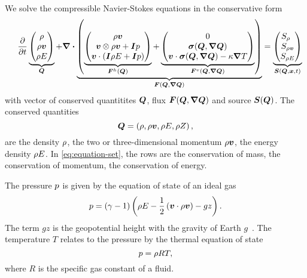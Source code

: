 \documentclass[runningheads]{llncs}
\newcommand{\eqA}{}
\newcommand{\eqB}{(}
\newcommand{\eqMultiA}{(}
\newcommand{\eqMultiB}{)}
\DeclareRobustCommand{\pcrefSingle}[1]{%
\begingroup%
  \renewcommand{\eqA}{(}\renewcommand{\eqB}{}%
\cref{#1}%
\endgroup%
}
\DeclareRobustCommand{\pcrefMulti}[1]{%
\begingroup%
    \renewcommand{\eqMultiA}{}\renewcommand{\eqMultiB}{}%
    (\cref{#1})%
\endgroup%
}
\DeclareRobustCommand{\pcref}[1]{%
\IfSubStr{#1}{,}{\pcrefMulti{#1}}{\pcrefSingle{#1}}%
}
\begin{document}
We  solve the compressible Navier-Stokes equations in the conservative form%
\begin{equation}
 \label{eq:equation-set} 
\quad
  \pdv{}{t}
  \underbrace{
  \begin{pmatrix}
    \Qrho\\
    \Qj\\
    \QE
    \end{pmatrix}}_{\Q}
  +
  \divergence{
  \underbrace{
  \left(
   \underbrace{\hyperFluxDef}_{\hyperFlux(\Q)}
+
\underbrace{\viscFluxDef}_{\viscFlux(\Q, \gradQ)}
  \right)}_{\flux(\Q, \gradQ)}}
 =
  \underbrace{
  \begin{pmatrix}
    \source[\Qrho\phantom{\Qrho}]\\
    \source[\Qj]\\
    \source[\QE]
    \end{pmatrix}}_{\source(\Q, \bm{x}, t)}
\end{equation}
with vector of conserved quantitites $\bm{Q}$, flux $\flux(\Q, \gradQ)$ and source $\source(\Q)$.
The conserved quantities
\begin{equation} 
  \label{eq:conserved-variables}
 \bm{Q} = \left( \rho, \rho \bm{v}, \rho E, \rho Z \right),
\end{equation}
are the density $\rho$, the two or three-dimensional momentum $\rho \bm{v}$, the energy density $\rho E$.
In \cref{eq:equation-set}, the rows are the conservation of mass, the conservation of momentum, the conservation of energy.

The pressure $p$ is given by the equation of state of an ideal gas
\begin{equation}
  \label{eq:eos}
  p = (\gamma - 1) \left(\rho E - \frac{1}{2} \left(\bm{v} \cdot \rho \bm{v} \right) - gz \right).
\end{equation}
The term $gz$ is the geopotential height with the gravity of Earth $g$~\cite{giraldo2008study}.
The temperature $T$ relates to the pressure by the thermal equation of state
\begin{equation}
  \label{eq:temperature}
  p = \rho R T,
\end{equation}
where $R$ is the specific gas constant of a fluid.
\end{document}
